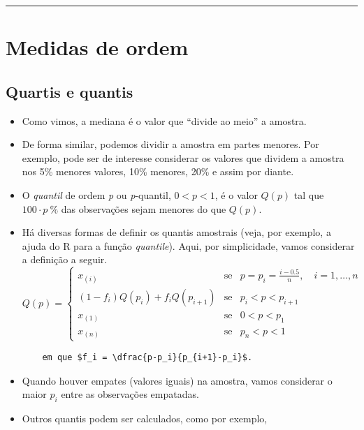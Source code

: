 \documentclass[
]{book}
\begin{document}
\begin{center}\rule{0.5\linewidth}{0.5pt}\end{center}

\section{Medidas de ordem}\label{medidas-de-ordem}

\subsection{Quartis e quantis}\label{quartis-e-quantis}

\begin{itemize}
\item
  Como vimos, a mediana é o valor que ``divide ao meio'' a amostra.\\
\item
  De forma similar, podemos dividir a amostra em partes menores. Por exemplo, pode ser de interesse considerar os valores que dividem a amostra nos 5\% menores valores, 10\% menores, 20\% e assim por diante.\\
\item
  O \emph{quantil} de ordem \emph{p} ou \emph{p}-quantil, \(0 < p < 1\), é o valor \(Q(p)\) tal que \(100\cdot p~\%\) das
  observações sejam menores do que \(Q(p)\).
\item
  Há diversas formas de definir os quantis amostrais (veja, por exemplo, a ajuda do R para a função \emph{quantile}). Aqui, por simplicidade, vamos considerar a definição a seguir.
  \[
  Q(p) =
  \left\{
  \begin{array}{lll}
    x_{(i)} & \text{se} & p = p_i = \frac{i - 0.5}{n}, \quad i = 1, \ldots, n \\
    (1 - f_i) Q(p_i) + f_i Q(p_{i+1}) & \text{se} & p_i < p < p_{i+1} \\
    x_{(1)} & \text{se} & 0 < p < p_1 \\
    x_{(n)} & \text{se} & p_n < p < 1
  \end{array}
  \right.
  \]

\begin{verbatim}
    em que $f_i = \dfrac{p-p_i}{p_{i+1}-p_i}$.
\end{verbatim}
\item
  Quando houver empates (valores iguais) na amostra, vamos considerar o maior \(p_i\) entre as observações empatadas.
\item
  Outros quantis podem ser calculados, como por exemplo,


\end{itemize}
\end{document}
